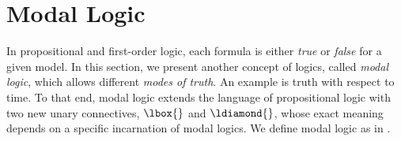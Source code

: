 







        
    \section{Modal Logic}
        \label{sec:modal-logic}

        In propositional and first-order logic, each formula is either \emph{true} or \emph{false} for a given model.
        In this section, we present another concept of logics, called \emph{modal logic}, which allows different \emph{modes of truth}. An example is truth with respect to time.
        To that end, modal logic extends the language of propositional logic with two new unary connectives, $\lbox{}$ and $\ldiamond{}$, whose exact meaning depends on a specific incarnation of modal logics.
        We define modal logic as in \cite{Huth04LogicInCS,JaparidzeJongh98HandbookProofTheory}.

